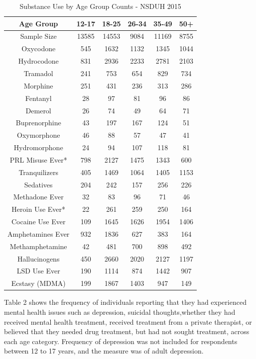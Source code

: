 \documentclass[sigconf]{acmart}
\begin{document}
\begin{table}
  \caption{Substance Use by Age Group Counts - NSDUH 2015
  \cite{samhsa16}}
  \label{tab:freq}
  \begin{tabular}{cccccc}
    \toprule
    Age Group & 12-17& 18-25& 26-34& 35-49& 50+\\
    \midrule
    Sample Size & 13585& 14553& 9084& 11169& 8755 \\
    \midrule
    Oxycodone& 545& 1632& 1132& 1345& 1044 \\
    Hydrocodone& 831& 2936& 2233& 2781& 2103 \\
    Tramadol& 241& 753& 654& 829& 734 \\
    Morphine& 251& 431& 236& 313& 286 \\
    Fentanyl& 28& 97& 81& 96& 86 \\
    Demerol& 26& 74& 49& 64& 71 \\
    Buprenorphine& 43& 197& 167& 124& 51 \\
    Oxymorphone& 46& 88& 57& 47& 41 \\
    Hydromorphone& 24& 94& 107& 118& 81 \\
    \midrule
    PRL Misuse Ever*& 798& 2127& 1475& 1343& 600 \\
    \midrule
    Tranquilizers& 405& 1469& 1064& 1405& 1153 \\
    Sedatives& 204& 242& 157& 256& 226 \\
    Methadone Ever& 32& 83& 96& 71& 46 \\
    \midrule
    Heroin Use Ever*& 22& 261& 259& 250& 164 \\
    \midrule
    Cocaine Use Ever& 109& 1645& 1626& 1954& 1406 \\
    Amphetamines Ever& 932& 1836& 627& 383& 164 \\
    Methamphetamine& 42& 481& 700&  898& 492 \\
    Hallucinogens& 450& 2660& 2020& 2127& 1197 \\
    LSD Use Ever& 190& 1114& 874& 1442& 907 \\
    Ecstasy (MDMA)& 199& 1867& 1403& 947& 149 \\
    \bottomrule
  \end{tabular}
\end{table}


Table 2 shows the frequency of individuals reporting that they had experienced
mental health issues such as depression, suicidal thoughts,whether they had 
received mental health treatment, received treatment from a private therapist, 
or believed that they needed drug treatment, but had not sought treatment, 
across each age category. Frequency of depression was not included for 
respondents between 12 to 17 years, and the measure was of adult depression. 
\end{document}
